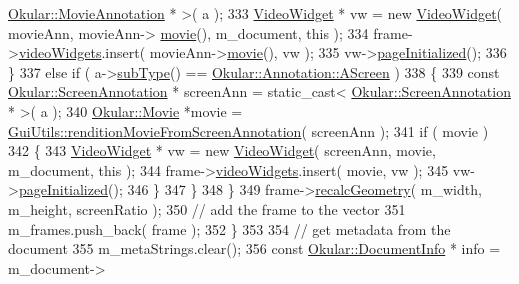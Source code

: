 \begin{DoxyCode}
      \hyperlink{classOkular_1_1MovieAnnotation}{Okular::MovieAnnotation} * \textcolor{keyword}{>}( a );
333                 \hyperlink{classVideoWidget}{VideoWidget} * vw = \textcolor{keyword}{new} \hyperlink{classVideoWidget}{VideoWidget}( movieAnn, movieAnn->
      \hyperlink{classOkular_1_1MovieAnnotation_a1fc38e32a1704351c3e5916031be0267}{movie}(), m\_document, this );
334                 frame->\hyperlink{structPresentationFrame_ace9a73ff662d4d93b3f9d7d22f6630cd}{videoWidgets}.insert( movieAnn->\hyperlink{classOkular_1_1MovieAnnotation_a1fc38e32a1704351c3e5916031be0267}{movie}(), vw );
335                 vw->\hyperlink{classVideoWidget_a90dbdcbaffc7717c7e3b327ad076bc58}{pageInitialized}();
336             \}
337             \textcolor{keywordflow}{else} \textcolor{keywordflow}{if} ( a->\hyperlink{classOkular_1_1Annotation_af9833449767eacd740f377e69a1fdd48}{subType}() == \hyperlink{classOkular_1_1Annotation_af71b46e37d5f850b97d5c4de3be9aac0a7cf8ba374ec139a8e2fb47a36182fa32}{Okular::Annotation::AScreen} )
338             \{
339                 \textcolor{keyword}{const} \hyperlink{classOkular_1_1ScreenAnnotation}{Okular::ScreenAnnotation} * screenAnn = \textcolor{keyword}{static\_cast<} 
      \hyperlink{classOkular_1_1ScreenAnnotation}{Okular::ScreenAnnotation} * \textcolor{keyword}{>}( a );
340                 \hyperlink{classOkular_1_1Movie}{Okular::Movie} *movie = 
      \hyperlink{namespaceGuiUtils_a51c606d14a293d5b3f5f49ad1c12be44}{GuiUtils::renditionMovieFromScreenAnnotation}( screenAnn );
341                 \textcolor{keywordflow}{if} ( movie )
342                 \{
343                     \hyperlink{classVideoWidget}{VideoWidget} * vw = \textcolor{keyword}{new} \hyperlink{classVideoWidget}{VideoWidget}( screenAnn, movie, m\_document,
       \textcolor{keyword}{this} );
344                     frame->\hyperlink{structPresentationFrame_ace9a73ff662d4d93b3f9d7d22f6630cd}{videoWidgets}.insert( movie, vw );
345                     vw->\hyperlink{classVideoWidget_a90dbdcbaffc7717c7e3b327ad076bc58}{pageInitialized}();
346                 \}
347             \}
348         \}
349         frame->\hyperlink{structPresentationFrame_a85b9ae3dd422b180b6fe976dd6719c3e}{recalcGeometry}( m\_width, m\_height, screenRatio );
350         \textcolor{comment}{// add the frame to the vector}
351         m\_frames.push\_back( frame );
352     \}
353 
354     \textcolor{comment}{// get metadata from the document}
355     m\_metaStrings.clear();
356     \textcolor{keyword}{const} \hyperlink{classOkular_1_1DocumentInfo}{Okular::DocumentInfo} * info = m\_document->

\end{DoxyCode}

